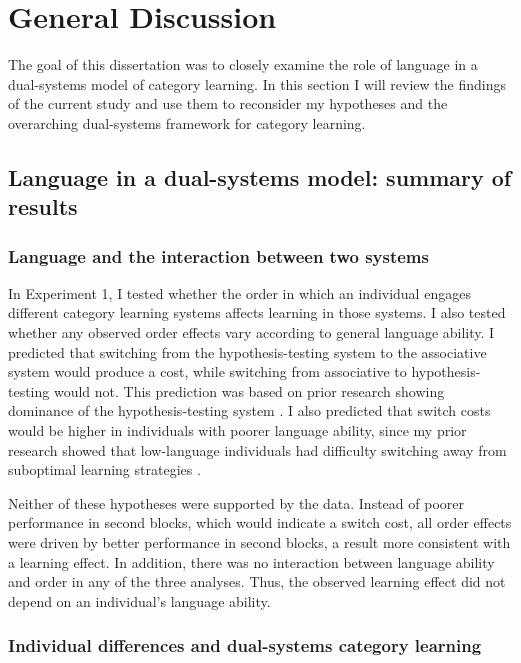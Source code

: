 \documentclass[../dissertation.tex]{subfiles}
\begin{document}
\section{General Discussion}

The goal of this dissertation was to closely examine the role of language in a dual-systems model of category learning. In this section I will review the findings of the current study and use them to reconsider my hypotheses and the overarching dual-systems framework for category learning.

\subsection{Language in a dual-systems model: summary of results}


\subsubsection{Language and the interaction between two systems}
In Experiment 1, I tested whether the order in which an individual engages different category learning systems affects learning in those systems. I also tested whether any observed order effects vary according to general language ability. I predicted that switching from the hypothesis-testing system to the associative system would produce a cost, while switching from associative to hypothesis-testing would not. This prediction was based on prior research showing dominance of the hypothesis-testing system \citep{Erickson2008, Ashby2010}. I also predicted that switch costs would be higher in individuals with poorer language ability, since my prior research showed that low-language individuals had difficulty switching away from suboptimal learning strategies \citep{Ryherd2019}. \par 
Neither of these hypotheses were supported by the data. Instead of poorer performance in second blocks, which would indicate a switch cost, all order effects were driven by better performance in second blocks, a result more consistent with a learning effect. In addition, there was no interaction between language ability and order in any of the three analyses. Thus, the observed learning effect did not depend on an individual's language ability.

\subsubsection{Individual differences and dual-systems category learning}
\end{document}
